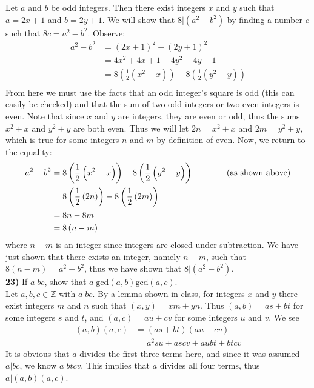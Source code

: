 \documentclass{scrartcl}
\begin{document}
Let $a$ and $b$ be odd integers. Then there exist integers $x$ and $y$ such that $a=2x+1$ and $b=2y+1$. We will show that $8|\left(a^2-b^2\right)$ by finding a number $c$ such that $8c = a^2-b^2$. Observe:
\begin{align*}
  a^2-b^2 &= \left(2x+1\right)^2 - \left(2y+1\right)^2\\
  &= 4x^2 + 4x + 1 - 4y^2 - 4y - 1\\
  &= 8\left(\frac{1}{2}\left(x^2-x\right)\right) - 8\left(\frac{1}{2}\left(y^2-y\right)\right)\\
\end{align*}
From here we must use the facts that an odd integer's square is odd (this can easily be checked) and that the sum of two odd integers or two even integers is even. Note that since $x$ and $y$ are integers, they are even or odd, thus the sums $x^2+x$ and $y^2+y$ are both even. Thus we will let $2n=x^2+x$ and $2m=y^2+y$, which is true for some integers $n$ and $m$ by definition of even. Now, we return to the equality:
\begin{align*}
  a^2-b^2 &=  8\left(\frac{1}{2}\left(x^2-x\right)\right) - 8\left(\frac{1}{2}\left(y^2-y\right)\right) \text{\hspace{0.5in} (as shown above)}\\
  &= 8\left(\frac{1}{2}\left(2n\right)\right)  - 8\left(\frac{1}{2}\left(2m\right)\right)\\
  &= 8n - 8m\\
  &= 8\left(n - m\right)
\end{align*}
where $n-m$ is an integer since integers are closed under subtraction. We have just shown that there exists an integer, namely $n-m$, such that
$8(n-m)=a^2-b^2$, thus we have shown that $8|\left(a^2-b^2\right)$.\\

\textbf{23)} If $a|bc$, show that $a|\text{gcd}(a,b)\text{gcd}(a,c)$.\\

Let $a,b,c\in\mathbb{Z}$ with $a|bc$. By a lemma shown in class, for integers $x$ and $y$ there exist integers $m$ and $n$ such that $(x,y) = xm+yn$. Thus $(a,b) = as+bt$ for some integers $s$ and $t$, and $(a,c) = au+cv$ for some integers $u$ and $v$. We see
\begin{align*}
  (a,b)(a,c) &= (as+bt)(au+cv)\\
  &= a^2su + ascv + aubt + btcv
\end{align*}
It is obvious that $a$ divides the first three terms here, and since it was assumed $a|bc$, we know $a|btcv$. This implies that $a$ divides all four terms, thus $a|(a,b)(a,c)$.
\end{document}
